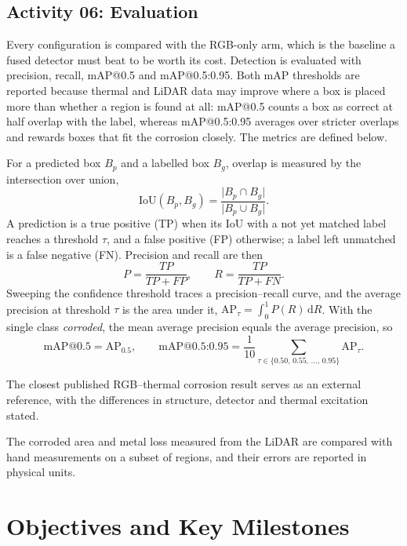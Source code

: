 \subsection{Activity 06: Evaluation}
\label{sec:evaluation}

Every configuration is compared with the RGB-only arm, which is the baseline a
fused detector must beat to be worth its cost. Detection is evaluated with
precision, recall, mAP@0.5 and mAP@0.5:0.95. Both mAP thresholds are reported
because thermal and LiDAR data may improve where a box is placed more than
whether a region is found at all: mAP@0.5 counts a box as correct at half
overlap with the label, whereas mAP@0.5:0.95 averages over stricter overlaps and
rewards boxes that fit the corrosion closely.
The metrics are defined below.

For a predicted box $B_p$ and a labelled box $B_g$, overlap is measured by the
intersection over union,
\begin{equation}
\mathrm{IoU}(B_p,B_g) = \frac{\lvert B_p \cap B_g \rvert}{\lvert B_p \cup B_g \rvert}.
\label{eq:iou}
\end{equation}
A prediction is a true positive (TP) when its IoU with a not yet matched label
reaches a threshold $\tau$, and a false positive (FP) otherwise; a label left
unmatched is a false negative (FN). Precision and recall are then
\begin{equation}
P = \frac{TP}{TP+FP}, \qquad R = \frac{TP}{TP+FN}.
\label{eq:pr}
\end{equation}
Sweeping the confidence threshold traces a precision--recall curve, and the
average precision at threshold $\tau$ is the area under it,
$\mathrm{AP}_\tau = \int_0^1 P(R)\,\mathrm{d}R$. With the single class
\emph{corroded}, the mean average precision equals the average precision, so
\begin{equation}
\text{mAP@0.5} = \mathrm{AP}_{0.5}, \qquad
\text{mAP@0.5:0.95} = \frac{1}{10} \sum_{\tau \in \{0.50,\,0.55,\,\ldots,\,0.95\}} \mathrm{AP}_\tau .
\label{eq:map}
\end{equation}

\noindent The closest published RGB--thermal
corrosion result \citep{Lim2021} serves as an external reference, with the
differences in structure, detector and thermal excitation stated.

The corroded area and metal loss measured from the LiDAR are compared with hand
measurements on a subset of regions, and their errors are reported in physical
units.

\section{Objectives and Key Milestones}
\label{sec:milestones}


